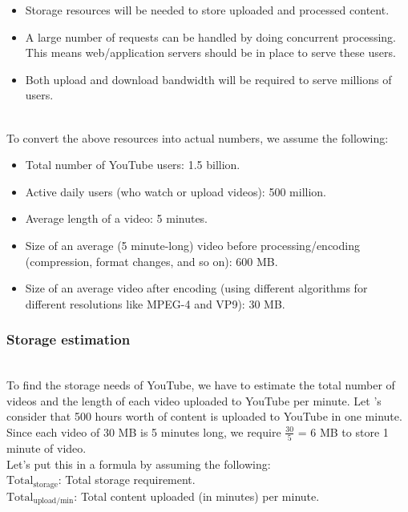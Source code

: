 \begin{itemize}
\item
\protect{}\label{6U0LxnL5ZiE__k7EHnzKh}
Storage resources will be needed to store uploaded and processed content.
\item
\protect{}\label{TDujGNGnM0pHLCpPihLix}
A large number of requests can be handled by doing concurrent processing. This means web/application servers should be in place to serve these users.
\item
\protect{}\label{va-oU_DqnvWdlViS3xbty}
Both upload and download bandwidth will be required to serve millions of users.
\end{itemize}
\\
To convert the above resources into actual numbers, we assume the following:

\begin{itemize}
\item
\protect{}\label{gSfamiMb9XdKqczaaAV4u}
Total number of YouTube users: 1.5 billion.
\item
\protect{}\label{rg2PYauUF17q3wr1_-Xhc}
Active daily users (who watch or upload videos): 500 million.
\item
\protect{}\label{QeqR0E8peBVfkFlrzXw6h}
Average length of a video: 5 minutes.
\item
\protect{}\label{A6aCkW_a63vgvfV9ZlTme}
Size of an average (5 minute-long) video before processing/encoding (compression, format changes, and so on): 600 MB.
\item
\protect{}\label{2IgIb3HttW4EMkyTL-w57}
Size of an average video after encoding (using different algorithms for different resolutions like MPEG-4 and VP9): 30 MB.
\end{itemize}

\subsubsection{Storage estimation}\label{Xvb9w4fqzvKNS5WgFQz5G}
\\
To find the storage needs of YouTube, we have to estimate the total number of videos and the length of each video uploaded to YouTube per minute. Let 's consider that 500 hours worth of content is uploaded to YouTube in one minute. Since each video of 30 MB is 5 minutes long, we require \protect{}\label{katex_inline_wxZrjlwVASv3Zwx7SZ-HQ}{{{\(\frac{30}{5}\)}}} = 6 MB to store 1 minute of video.
\\
Let's put this in a formula by assuming the following:
\\
\protect{}\label{katex_inline_xy9jZ9WZHeYFZ9ONqbhiz}{{{\(\text{Total}_\text{{storage}}\)}}}: Total storage requirement.
\\
\protect{}\label{katex_inline_6QCKSF8czmgtWIMY619Bq}{{{\(\text{Total}_\text{{upload/min}}\)}}}: Total content uploaded (in minutes) per minute.


